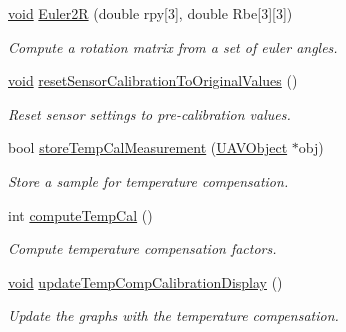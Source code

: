 \begin{DoxyCompactItemize}
\hyperlink{group___u_a_v_objects_plugin_ga444cf2ff3f0ecbe028adce838d373f5c}{void} \hyperlink{class_calibration_a377eb05dfcb626f7b5af01ea1647d9ae}{\-Euler2\-R} (double rpy\mbox{[}3\mbox{]}, double \-Rbe\mbox{[}3\mbox{]}\mbox{[}3\mbox{]})
\begin{DoxyCompactList}\small\item\em \-Compute a rotation matrix from a set of euler angles. \end{DoxyCompactList}\item 
\hyperlink{group___u_a_v_objects_plugin_ga444cf2ff3f0ecbe028adce838d373f5c}{void} \hyperlink{class_calibration_afb4b17903974c7e7142cb5e65d29c967}{reset\-Sensor\-Calibration\-To\-Original\-Values} ()
\begin{DoxyCompactList}\small\item\em \-Reset sensor settings to pre-\/calibration values. \end{DoxyCompactList}\item 
bool \hyperlink{class_calibration_a08dbde1fd3231dc4ec7f6a6132adcc80}{store\-Temp\-Cal\-Measurement} (\hyperlink{class_u_a_v_object}{\-U\-A\-V\-Object} $\ast$obj)
\begin{DoxyCompactList}\small\item\em \-Store a sample for temperature compensation. \end{DoxyCompactList}\item 
int \hyperlink{class_calibration_a00f7ee1317e4c7b92b8c60a5f513698d}{compute\-Temp\-Cal} ()
\begin{DoxyCompactList}\small\item\em \-Compute temperature compensation factors. \end{DoxyCompactList}\item 
\hyperlink{group___u_a_v_objects_plugin_ga444cf2ff3f0ecbe028adce838d373f5c}{void} \hyperlink{class_calibration_aa6f828b26cfbaecba7ebb8f1ab90fea4}{update\-Temp\-Comp\-Calibration\-Display} ()
\begin{DoxyCompactList}\small\item\em \-Update the graphs with the temperature compensation. \end{DoxyCompactList}\end{DoxyCompactItemize}

